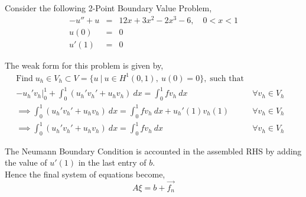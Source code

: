 \begin{example}
		Consider the following 2-Point Boundary Value Problem,
		\begin{eqnarray}
		-u'' + u &=& 12x + 3x^2 - 2x^3 - 6, \quad 0<x<1\\
		u(0) &=& 0\\
		u'(1) &=& 0
		\end{eqnarray}
		
		The weak form for this problem is given by,
		\begin{eqnarray}\nonumber
		\text{Find} \; u_h \in V_h \subset V = \{u \ | \ u \in H^1(0,1), \ u(0) = 0\}, \; \text{such that} \\\nonumber
		- u_h'v_h \Big|_0^1 + \int_{0}^{1} (u_h' v_h' + u_h v_h) \ dx = \int_{0}^{1} f v_h \ dx \qquad &\forall v_h \in V_h&	\\
		\implies \int_{0}^{1} (u_h' v_h' + u_h v_h) \ dx = \int_{0}^{1} f v_h \ dx  + u_h'(1)v_h(1)\qquad &\forall v_h \in V_h&\\
		\implies \int_{0}^{1} (u_h' v_h' + u_h v_h) \ dx = \int_{0}^{1} f v_h \ dx  \qquad &\forall v_h \in V_h&
		\end{eqnarray}	
		
		The Neumann Boundary Condition is accounted in the assembled RHS by adding the value of $u'(1)$ in the last entry of $b$.\\
		
		Hence the final system of equations become,
		\begin{equation}
			A \xi = b + \vec{f_n}
		\end{equation}
		

\end{example}
